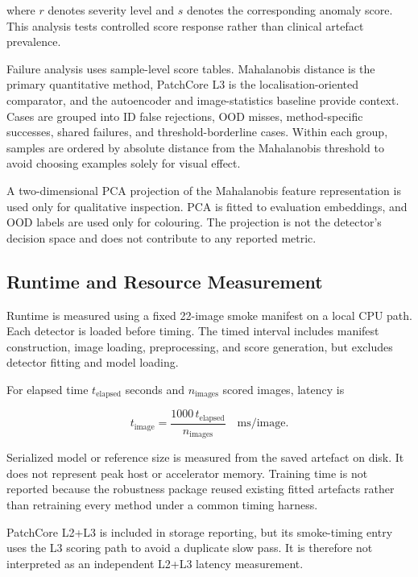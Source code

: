 \documentclass[fleqn,12pt]{olplainarticle}
\begin{document}
where $r$ denotes severity level and $s$ denotes the corresponding anomaly
score. This analysis tests controlled score response rather than clinical
artefact prevalence.

Failure analysis uses sample-level score tables. Mahalanobis distance is the
primary quantitative method, PatchCore L3 is the localisation-oriented
comparator, and the autoencoder and image-statistics baseline provide context.
Cases are grouped into ID false rejections, OOD misses, method-specific
successes, shared failures, and threshold-borderline cases. Within each group,
samples are ordered by absolute distance from the Mahalanobis threshold to
avoid choosing examples solely for visual effect.

A two-dimensional PCA projection of the Mahalanobis feature representation is
used only for qualitative inspection. PCA is fitted to evaluation embeddings,
and OOD labels are used only for colouring. The projection is not the
detector's decision space and does not contribute to any reported metric.

\subsection{Runtime and Resource Measurement}
\label{subsec:runtime_protocol}

Runtime is measured using a fixed 22-image smoke manifest on a local CPU path.
Each detector is loaded before timing. The timed interval includes manifest
construction, image loading, preprocessing, and score generation, but excludes
detector fitting and model loading.

For elapsed time $t_{\mathrm{elapsed}}$ seconds and
$n_{\mathrm{images}}$ scored images, latency is

\begin{equation}
    t_{\mathrm{image}}
    =
    \frac{
        1000\,t_{\mathrm{elapsed}}
    }{
        n_{\mathrm{images}}
    }
    \quad
    \text{ms/image}.
    \label{eq:protocol_runtime_per_image}
\end{equation}

Serialized model or reference size is measured from the saved artefact on
disk. It does not represent peak host or accelerator memory. Training time is
not reported because the robustness package reused existing fitted artefacts
rather than retraining every method under a common timing harness.

PatchCore L2+L3 is included in storage reporting, but its smoke-timing entry
uses the L3 scoring path to avoid a duplicate slow pass. It is therefore not
interpreted as an independent L2+L3 latency measurement.
\end{document}
